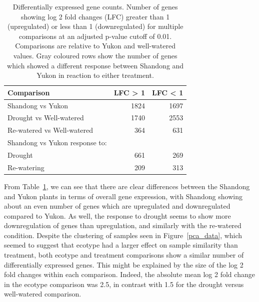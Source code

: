 \documentclass[12pt]{article}
\begin{document}
	\begin{table}[H]
		\centering
		\begin{tabular}{lrr}
			\toprule
			Comparison & LFC > 1 & LFC < 1 \\
			\midrule
			Shandong vs Yukon & 1824 & 1697 \\
			Drought vs Well-watered & 1740  & 2553 \\
			Re-watered vs Well-watered & 364 & 631 \\
			\rowcolor{Gray}
			Shandong vs Yukon response to: && \\
			\rowcolor{Gray}
			Drought & 661 & 269 \\
			\rowcolor{Gray}
			Re-watering & 209 & 313 \\
			\bottomrule
		\end{tabular}
		\caption[Differentially expressed gene counts]{Differentially expressed gene counts. Number of genes showing log 2 fold changes (LFC) greater than 1 (upregulated) or less than 1 (downregulated) for multiple comparisons at an adjusted p-value cutoff of 0.01. Comparisons are relative to Yukon and well-watered values. Gray coloured rows show the number of genes which showed a different response between Shandong and Yukon in reaction to either treatment.}
		\label{lfcs}
	\end{table}
	
	From Table~\ref{lfcs}, we can see that there are clear differences between the Shandong and Yukon plants in terms of overall gene expression, with Shandong showing about an even number of genes which are upregulated and downregulated compared to Yukon. As well, the response to drought seems to show more downregulation of genes than upregulation, and similarly with the re-watered condition. Despite the clustering of samples seen in Figure~\ref{pca_data}, which seemed to suggest that ecotype had a larger effect on sample similarity than treatment, both ecotype and treatment comparisons show a similar number of differentially expressed genes. This might be explained by the size of the log 2 fold changes within each comparison. Indeed, the absolute mean log 2 fold change in the ecotype comparison was 2.5, in contrast with 1.5	for the drought versus well-watered comparison.
	
\end{document}
